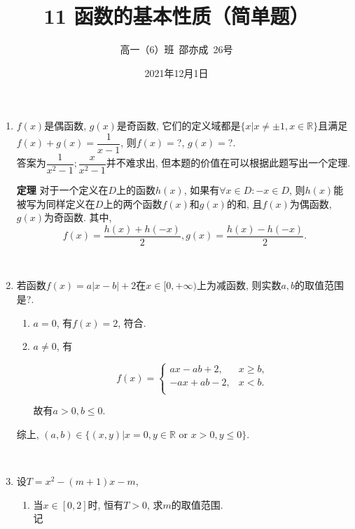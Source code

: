 \documentclass[8pt]{article}
\author{高一（6）班\ 邵亦成\ 26号}
\title{11 函数的基本性质（简单题）}
\date{2021年12月1日}
\begin{document}
	\maketitle

	\begin{enumerate}[label=\arabic*.]
		\item $f(x)$是偶函数, $g(x)$是奇函数, 它们的定义域都是$\{x|x\neq \pm 1, x\in \mathbb{R}\}$且满足$f(x)+g(x)=\dfrac{1}{x-1}$, 则$f(x)=$?, $g(x)=$?.
			~\\

			答案为$\dfrac{1}{x^2-1}; \dfrac{x}{x^2-1}$并不难求出, 但本题的价值在可以根据此题写出一个定理.

			\textbf{定理  } 对于一个定义在$D$上的函数$h(x)$, 如果有$\forall x\in D: -x \in D$, 则$h(x)$能被写为同样定义在$D$上的两个函数$f(x)$和$g(x)$的和, 且$f(x)$为偶函数, $g(x)$为奇函数. 其中, $$f(x)=\dfrac{h(x)+h(-x)}{2}, g(x)=\dfrac{h(x)-h(-x)}{2}.$$

		~\\

		\item 若函数$f(x)=a|x-b|+2$在$x\in[0, +\infty)$上为减函数, 则实数$a, b$的取值范围是?.
			~\\

			\begin{enumerate}[label=$\arabic*^{\circ}$]
				\item $a=0$, 有$f(x)=2$, 符合.

				\item $a\neq 0$, 有

				$$f(x)=\left\{\begin{array}{rl}ax-ab+2, &x\geq b,\\-ax+ab-2, &x<b.\\\end{array}\right.$$

				故有$a>0, b\leq 0$.
			\end{enumerate}

			综上, $(a, b)\in \{(x, y)|x=0, y\in\mathbb{R} \text{ or } x>0, y\leq 0\}$.

		~\\

		\item 设$T=x^2-(m+1)x-m$,
			\begin{enumerate}[label=(\arabic*)]
				\item 当$x\in[0, 2]$时, 恒有$T>0$, 求$m$的取值范围.
					~\\

					记


\end{enumerate}
\end{enumerate}
\end{document}
